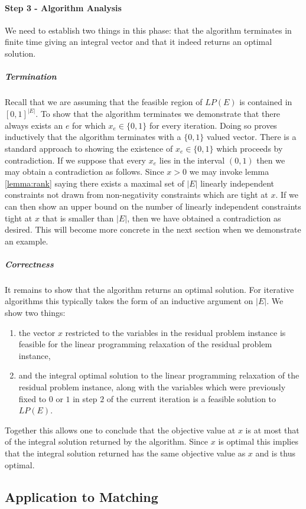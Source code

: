 \paragraph{Step 3 - Algorithm Analysis}
We need to establish two things in this phase: that the algorithm terminates in finite time giving an integral vector and that it indeed returns an optimal solution.
\subparagraph{Termination} Recall that we are assuming that the feasible region of $LP(E)$ is contained in $[0,1]^{|E|}$. To show that the algorithm terminates we demonstrate that there always exists an $e$ for which $x_e \in \{0,1\}$ for every iteration. Doing so proves inductively that the algorithm terminates with a $\{0,1\}$ valued vector. There is a standard approach to showing the existence of $x_e \in \{0,1\}$ which proceeds by contradiction. If we suppose that every $x_e$ lies in the interval $(0,1)$ then we may obtain a contradiction as follows. Since $x>0$ we may invoke lemma \ref{lemma:rank} saying there exists a maximal set of $|E|$ linearly independent constraints not drawn from non-negativity constraints which are tight at $x$. If we can then show an upper bound on the number of linearly independent constraints tight at $x$ that is smaller than $|E|$, then we have obtained a contradiction as desired. This will become more concrete in the next section when we demonstrate an example.
\subparagraph{Correctness} It remains to show that the algorithm returns an optimal solution. For iterative algorithms this typically takes the form of an inductive argument on $|E|$. We show two things:
\begin{enumerate}
\item the vector $x$ restricted to the variables in the residual problem instance is feasible for the linear programming relaxation of the residual problem instance,
\item and the integral optimal solution to the linear programming relaxation of the residual problem instance, along with the variables which were previously fixed to $0$ or $1$ in step $2$ of the current iteration is a feasible solution to $LP(E)$.
\end{enumerate}
Together this allows one to conclude that the objective value at $x$ is at most that of the integral solution returned by the algorithm. Since $x$ is optimal this implies that the integral solution returned has the same objective value as $x$ and is thus optimal.
\subsection{Application to Matching}\label{subsec:irapp}
